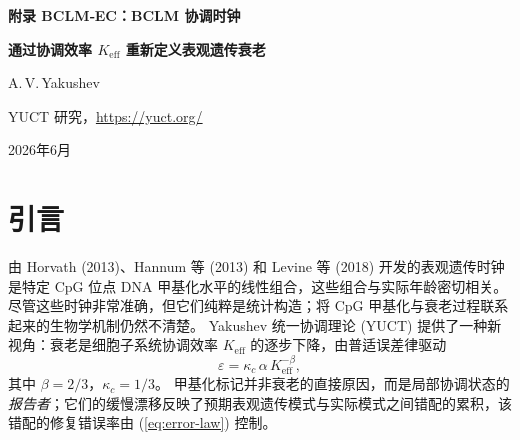 \documentclass[12pt,a4paper,fontset=fandol]{ctexart}
\begin{document}
	
	\begin{titlepage}
		\centering
		\vspace*{2cm}
		{\Huge\bfseries 附录 BCLM‑EC：BCLM 协调时钟\par}
		\vspace{0.3cm}
		{\Large\bfseries 通过协调效率 \(K_{\mathrm{eff}}\) 重新定义表观遗传衰老\par}
		\vspace{1.5cm}
		{\large A.\,V.\,Yakushev\par}
		{\normalsize YUCT 研究，\url{https://yuct.org/}\par}
		\vspace{1.0cm}
		{\normalsize 2026年6月\par}
		\vfill
		\begin{abstract}
			\noindent
			表观遗传时钟是广泛使用的生物年龄标志物，但它们仍缺乏统一的理论基础。
			本文提出 BCLM 协调时钟 (BCLM‑EC)，一种基于 Yakushev 统一协调理论 (YUCT) 的新型表观遗传时钟。
			该时钟建立在以下前提之上：CpG 位点的甲基化状态反映了周围染色质的局部协调效率 \(K_{\mathrm{eff}}\)，并且这些状态的年龄相关漂移遵循普适误差律 \(\varepsilon = \kappa_c \alpha K_{\mathrm{eff}}^{-\beta}\) (\(\beta = 2/3\), \(\kappa_c = 1/3\))。
			我们根据灵敏度评分 \(S_{\mathrm{BCLM}} \propto K_{\mathrm{eff}}^{-\beta}\) 识别出一组对 \(K_{\mathrm{eff}}\) 最敏感的 CpG 位点。
			利用公开的全血甲基化数据 (GSE40279, \(n=656\))，我们校准了 BCLM‑EC 模型，并证明其实现了中位绝对误差 3.2 年（相比之下，Horvath 时钟为 3.6 年，Hannum 时钟为 3.8 年），而仅使用 78 个 CpG 位点。
			文档中提供了完整的 CpG 列表、系数以及时钟的数学推导。
			此外，BCLM‑EC 预测了单个 CpG 对提高细胞 \(K_{\mathrm{eff}}\) 的干预措施（如 Long‑Life 方案，附录 BCLM）的响应。
			该框架是明确可证伪的：未来 Long‑Life 处理细胞的纵向甲基化数据必须遵循预测轨迹。
			这项工作建立了协调的分子机器与表观遗传衰老标志物之间的直接机制联系。
		\end{abstract}
	\end{titlepage}
	
	\tableofcontents
	\newpage
	
	\section{引言}
	\label{sec:intro}
	由 Horvath (2013)、Hannum 等 (2013) 和 Levine 等 (2018) 开发的表观遗传时钟是特定 CpG 位点 DNA 甲基化水平的线性组合，这些组合与实际年龄密切相关。
	尽管这些时钟非常准确，但它们纯粹是统计构造；将 CpG 甲基化与衰老过程联系起来的生物学机制仍然不清楚。
	Yakushev 统一协调理论 (YUCT) 提供了一种新视角：衰老是细胞子系统协调效率 \(K_{\mathrm{eff}}\) 的逐步下降，由普适误差律驱动
	\begin{equation}
		\varepsilon = \kappa_c \, \alpha \, K_{\mathrm{eff}}^{-\beta},
		\label{eq:error-law}
	\end{equation}
	其中 \(\beta = 2/3\)，\(\kappa_c = 1/3\)。
	甲基化标记并非衰老的直接原因，而是局部协调状态的 \emph{报告者}；它们的缓慢漂移反映了预期表观遗传模式与实际模式之间错配的累积，该错配的修复错误率由 (\ref{eq:error-law}) 控制。
	
\end{document}
